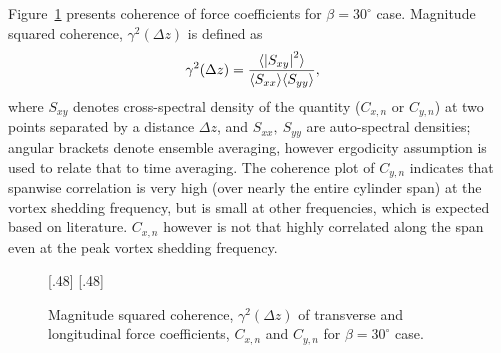 Figure~\ref{fig:Coherence_Yawed30_Re20k} presents coherence of force
coefficients for $\beta=30^\circ$ case. Magnitude squared coherence,
$\gamma^2(\Delta z)$ is defined as
%
\begin{align}
  \gamma^2(\Delta z) &= \frac{\langle \left| S_{xy} \right|^2 \rangle}{\langle
    S_{xx}\rangle \langle S_{yy} \rangle},
  \label{eq:coherence}
\end{align}
%
where $S_{xy}$ denotes cross-spectral density of the quantity ($C_{x,n}$ or
$C_{y,n}$) at two points separated by a distance $\Delta z$, and
$S_{xx},~S_{yy}$ are auto-spectral densities; angular brackets denote ensemble
averaging, however ergodicity assumption is used to relate that to time
averaging. The coherence plot of $C_{y,n}$ indicates that spanwise correlation
is very high (over nearly the entire cylinder span) at the vortex shedding
frequency, but is small at other frequencies, which is expected based on
literature. $C_{x,n}$ however is not that highly correlated along the span even
at the peak vortex shedding frequency.
%
\begin{figure}[htb!]
    [.48\linewidth]{}
  \hspace*{\fill}
    [.48\linewidth]{}
    \caption{Magnitude squared coherence, $\gamma^2(\Delta z)$ of transverse
      and longitudinal force coefficients, $C_{x,n}$ and $C_{y,n}$ for
      $\beta=30^\circ$ case.}
  \label{fig:Coherence_Yawed30_Re20k}
\end{figure}
